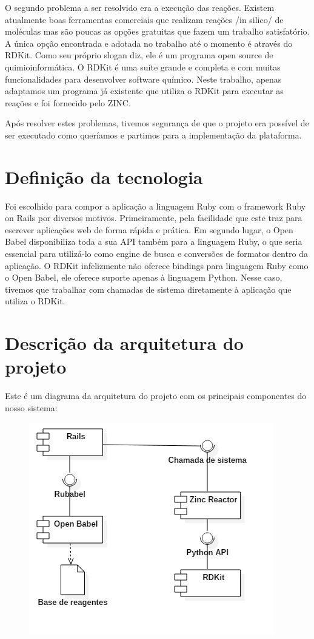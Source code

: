 \documentclass{abnt}
\begin{document}
O segundo problema a ser resolvido era a execução das reações. Existem atualmente
boas ferramentas comerciais que realizam reações /in silico/ de moléculas mas são
poucas as opções gratuitas que fazem um trabalho satisfatório. A única opção encontrada
e adotada no trabalho até o momento é através do RDKit. Como seu próprio slogan diz,
ele é um programa open source de quimioinformática. O RDKit é uma suíte grande e
completa e com muitas funcionalidades para desenvolver software químico. Neste trabalho,
apenas adaptamos um programa já existente que utiliza o RDKit para executar as reações
e foi fornecido pelo ZINC.

Após resolver estes problemas, tivemos segurança de que o projeto era possível de
ser executado como queríamos e partimos para a implementação da plataforma.

\section{Definição da tecnologia}

Foi escolhido para compor a aplicação a linguagem Ruby com o framework Ruby on Rails
por diversos motivos. Primeiramente, pela facilidade que este traz para escrever
aplicações web de forma rápida e prática. Em segundo lugar, o Open Babel disponibiliza
toda a sua API também para a linguagem Ruby, o que seria essencial para utilizá-lo
como engine de busca e conversões de formatos dentro da aplicação. O RDKit infelizmente
não oferece bindings para linguagem Ruby como o Open Babel, ele oferece suporte
apenas à linguagem Python. Nesse caso, tivemos que trabalhar com chamadas de sistema
diretamente à aplicação que utiliza o RDKit.

\section{Descrição da arquitetura do projeto}

Este é um diagrama da arquitetura do projeto com os principais componentes do nosso sistema:

\begin{figure}[h]
\includegraphics[scale=.8]{diagrama_de_arquitetura.png}
\end{figure}
\end{document}
